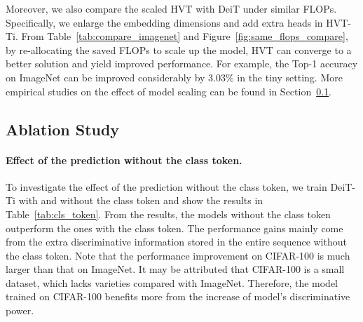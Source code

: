 Moreover, we also compare the scaled HVT with DeiT under similar FLOPs. Specifically, we enlarge the embedding dimensions and add extra heads in HVT-Ti. From Table~\ref{tab:compare_imagenet} and Figure~\ref{fig:same_flops_compare}, by re-allocating the saved FLOPs to scale up the model, HVT can converge to a better solution and yield improved performance. For example, the Top-1 accuracy on ImageNet can be improved considerably by 3.03\% in the tiny setting. More empirical studies on the effect of model scaling can be found in Section~\ref{ablation}.

\subsection{Ablation Study} 
\label{ablation}

\paragraph{Effect of the prediction without the class token.}
To investigate the effect of the prediction without the class token, we train DeiT-Ti with and without the class token and show the results in Table~\ref{tab:cls_token}.  
From the results, the models without the class token outperform the ones with the class token. The performance gains mainly come from the extra  discriminative information stored in the entire sequence without the class token.
Note that the performance improvement on CIFAR-100 is much larger than that on ImageNet. It may be attributed that CIFAR-100 is a small dataset, which lacks varieties compared with ImageNet. Therefore, the model trained on CIFAR-100 benefits more from the increase of model's discriminative power.



\begin{table}[]
\centering
\caption{Performance comparisons on HVT-S-4 with three downsampling operations: convolution, max pooling and average pooling. We report the Top-1 and Top-5 accuracy on CIFAR-100.
}
\vspace{-5pt}
\renewcommand\arraystretch{1.2}
\label{tab:pool_type}
\vspace{-10pt}
\end{table}


